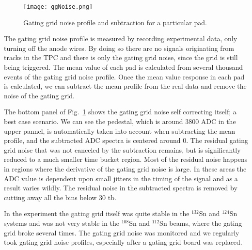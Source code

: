  
\begin{figure}[!htb]
\centering
\texttt{[image: ggNoise.png]}
\caption{Gating grid noise profile and subtraction for a particular pad.}
\label{fig:ggNoiseSub}
\end{figure}

The gating grid noise profile is measured by recording experimental data, only turning off the anode wires. By doing so there are no signals originating from tracks in the TPC and there is only the gating grid noise, since the grid is still being triggered.  The mean value of each pad is calculated from several thousand events of the gating grid noise profile. Once the mean value response in each pad is calculated, we can subtract the mean profile from the real data and remove the noise of the gating grid.

The bottom panel of Fig.~\ref{fig:ggNoiseSub} shows the gating grid noise self correcting itself; a best case scenario. We can see the pedestal, which is around 3800 ADC in the upper pannel,  is automatically taken into account when subtracting the mean profile, and the subtracted ADC spectra is centered around 0. The residual gating grid noise that was not canceled by the subtraction remains, but is significantly reduced to a much smaller time bucket region. Most of the residual noise happens in regions where the derivative of the gating grid noise is large. In these areas the ADC value is dependent upon small jitters in the timing of the signal and as a result varies wildly. The residual noise in the subtracted spectra is removed by cutting away all the bins below 30 tb. 

In the experiment the gating grid itself was quite stable in the  ${}^{132}$Sn and ${}^{124}$Sn systems and was not very stable in the ${}^{108}$Sn and ${}^{112}$Sn beams, where the gating grid broke several times. The gating grid noise was monitored and we regularly took gating grid noise profiles, especially after a gating grid board was replaced. 



